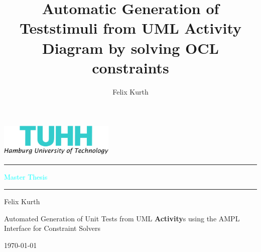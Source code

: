 \documentclass[twoside, english,numbers=noenddot, abstracton, headsepline, openright]{scrreprt}
\author{Felix Kurth}
\title{Automatic Generation of Teststimuli from UML Activity Diagram by solving OCL constraints}
\newcommand{\UMLType}[1]{\textbf{#1}}
\begin{document}
\titlepage

\setlength{\parskip}{1pt}

\noindent \begin{flushright}
\includegraphics[width=55mm,height=16mm]{pics/tuhh_logo}
\par\end{flushright}

\textcolor{cyan}{\rule[0.5ex]{1\columnwidth}{0.5pt}}

\textsf{\textcolor{cyan}{\Large Master Thesis}}{\Large \par}

\textcolor{cyan}{\rule[0.5ex]{1\columnwidth}{0.5pt}}

\vspace{32mm}


\noindent \begin{flushright}
\textsf{\Large  Felix Kurth}\textsf{\textbf{\Large }}\\
\textsf{\vspace{1.2cm}
}
\par\end{flushright}

\noindent \begin{flushright}
\textsf{\huge Automated Generation of Unit Tests from UML \UMLType{Activity}s using the AMPL Interface for Constraint Solvers}\\
\par\end{flushright}{\huge \par}

\vspace{45mm}


\noindent \begin{flushright}
\textsf{\Large \today}
\par\end{flushright}{\Large \par}
\end{document}

